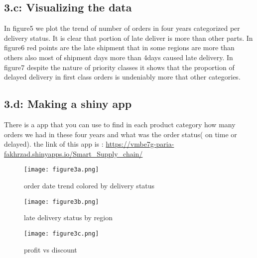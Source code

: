 \documentclass[a4paper, 11pt]{article}
\begin{document}
\subsection*{3.c: Visualizing the data}
In figure5 we plot the trend of number of orders in four years categorized per delivery status. It is clear that portion of late deliver is more than other parts.
In figure6 red points are the late shipment that in some regions are more than others also most of shipment days more than 4days caused late delivery.
In figure7 despite the nature of priority classes it shows that the proportion of delayed delivery in first class orders is undeniably more that other categories. 

\subsection*{3.d: Making a shiny app}
There is a app that you can use to find in each product category how many orders we had in these four years and what was the order status( on time or delayed).
the link of this app is : \url{https://vmbe7g-paria-fakhrzad.shinyapps.io/Smart_Supply_chain/}


\begin{figure}[H]
	\texttt{[image: figure3a.png]}
	\caption{order date trend colored by delivery status}
	\label{Figure3a}
\end{figure}
\begin{figure}[H]
	\texttt{[image: figure3b.png]}
	\caption{late delivery status by region}
	\label{Figure3b}
\end{figure}
\begin{figure}[H]
	\texttt{[image: figure3c.png]}
	\caption{profit vs discount}
	\label{Figure3c}
\end{figure}


\newpage


\end{document}
